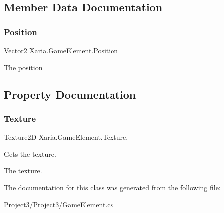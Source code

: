 \subsection{Member Data Documentation}
\mbox{\label{classXaria_1_1GameElement_aca8d4e3746e4ec94a95bd10275512fbc}} 
\subsubsection{\texorpdfstring{Position}{Position}}
{\footnotesize\ttfamily Vector2 Xaria.\+Game\+Element.\+Position\hspace{0.3cm}{\ttfamily [package]}}



The position 



\subsection{Property Documentation}
\mbox{\label{classXaria_1_1GameElement_ae5816c3fd6f76aa7af85b1cc9c8a5cf8}} 
\subsubsection{\texorpdfstring{Texture}{Texture}}
{\footnotesize\ttfamily Texture2D Xaria.\+Game\+Element.\+Texture\hspace{0.3cm}{\ttfamily [get]}, {\ttfamily [set]}}



Gets the texture. 

The texture. 

The documentation for this class was generated from the following file\+:\begin{DoxyCompactItemize}
\item 
Project3/\+Project3/\hyperlink{GameElement_8cs}{Game\+Element.\+cs}\end{DoxyCompactItemize}
